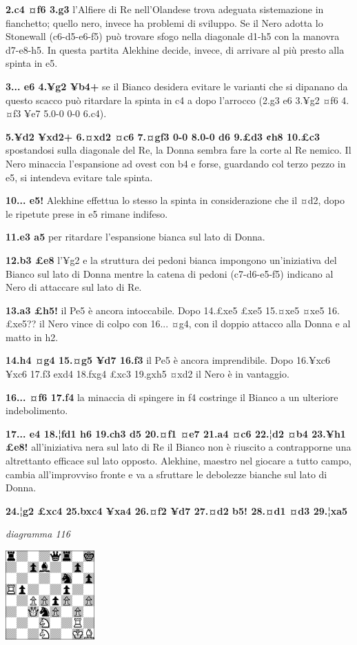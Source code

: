 \documentclass[
]{article}
\begin{document}
\textbf{2.c4 ¤f6 3.g3} l'Alfiere di Re nell'Olandese trova adeguata
sistemazione in fianchetto; quello nero, invece ha problemi di sviluppo.
Se il Nero adotta lo Stonewall (c6-d5-e6-f5) può trovare sfogo nella
diagonale d1-h5 con la manovra d7-e8-h5. In questa partita Alekhine
decide, invece, di arrivare al più presto alla spinta in e5.

\textbf{3... e6 4.¥g2 ¥b4+} se il Bianco desidera evitare le varianti
che si dipanano da questo scacco può ritardare la spinta in c4 a dopo
l'arrocco (2.g3 e6 3.¥g2 ¤f6 4.¤f3 ¥e7 5.0-0 0-0 6.c4).

\textbf{5.¥d2 ¥xd2+ 6.¤xd2 ¤c6 7.¤gf3 0-0 8.0-0 d6 9.£d3 ¢h8 10.£c3}
spostandosi sulla diagonale del Re, la Donna sembra fare la corte al Re
nemico. Il Nero minaccia l'espansione ad ovest con b4 e forse, guardando
col terzo pezzo in e5, si intendeva evitare tale spinta.

\textbf{10... e5!} Alekhine effettua lo stesso la spinta in
considerazione che il ¤d2, dopo le ripetute prese in e5 rimane indifeso.

\textbf{11.e3 a5} per ritardare l'espansione bianca sul lato di Donna.

\textbf{12.b3 £e8} l'¥g2 e la struttura dei pedoni bianca impongono
un'iniziativa del Bianco sul lato di Donna mentre la catena di pedoni
(c7-d6-e5-f5) indicano al Nero di attaccare sul lato di Re.

\textbf{13.a3 £h5!} il Pe5 è ancora intoccabile. Dopo 14.£xe5 £xe5
15.¤xe5 ¤xe5 16.£xe5?? il Nero vince di colpo con 16... ¤g4, con il
doppio attacco alla Donna e al matto in h2.

\textbf{14.h4 ¤g4 15.¤g5 ¥d7 16.f3} il Pe5 è ancora imprendibile. Dopo
16.¥xc6 ¥xc6 17.f3 exd4 18.fxg4 £xc3 19.gxh5 ¤xd2 il Nero è in
vantaggio.

\textbf{16... ¤f6 17.f4} la minaccia di spingere in f4 costringe il
Bianco a un ulteriore indebolimento.

\textbf{17... e4 18.¦fd1 h6 19.ch3 d5 20.¤f1 ¤e7 21.a4 ¤c6 22.¦d2 ¤b4
23.¥h1 £e8!} all'iniziativa nera sul lato di Re il Bianco non è riuscito
a contrapporne una altrettanto efficace sul lato opposto. Alekhine,
maestro nel giocare a tutto campo, cambia all'improvviso fronte e va a
sfruttare le debolezze bianche sul lato di Donna.

\textbf{24.¦g2 £xc4 25.bxc4 ¥xa4 26.¤f2 ¥d7 27.¤d2 b5! 28.¤d1 ¤d3
29.¦xa5}

\emph{diagramma 116}

\includegraphics[width=1.33889in,height=1.33889in]{vertopal_109f12be458a423d8f3cc838880eaea2/media/image116.png}
\end{document}
